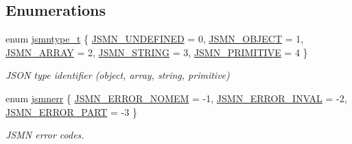 \subsection*{Enumerations}
\begin{DoxyCompactItemize}
\item 
enum \hyperlink{namespace_json_parser_generator_r_k_a45d8af9d310679633d258ed9b2caeeb3}{jsmntype\+\_\+t} \{ \newline
\hyperlink{namespace_json_parser_generator_r_k_a45d8af9d310679633d258ed9b2caeeb3af38a3f5a9af2aaf83f0fd6b38e6d80c5}{J\+S\+M\+N\+\_\+\+U\+N\+D\+E\+F\+I\+N\+ED} = 0, 
\hyperlink{namespace_json_parser_generator_r_k_a45d8af9d310679633d258ed9b2caeeb3a821e92d4b14438ba747826d5b889fe48}{J\+S\+M\+N\+\_\+\+O\+B\+J\+E\+CT} = 1, 
\hyperlink{namespace_json_parser_generator_r_k_a45d8af9d310679633d258ed9b2caeeb3a4f5a3b6dbf7ce0e6419264e11a7848c0}{J\+S\+M\+N\+\_\+\+A\+R\+R\+AY} = 2, 
\hyperlink{namespace_json_parser_generator_r_k_a45d8af9d310679633d258ed9b2caeeb3a672e86ca38a72245272a29ecdbe74a1a}{J\+S\+M\+N\+\_\+\+S\+T\+R\+I\+NG} = 3, 
\newline
\hyperlink{namespace_json_parser_generator_r_k_a45d8af9d310679633d258ed9b2caeeb3af36fefddaeac9a91bc69c938c8924568}{J\+S\+M\+N\+\_\+\+P\+R\+I\+M\+I\+T\+I\+VE} = 4
 \}\begin{DoxyCompactList}\small\item\em J\+S\+ON type identifier (object, array, string, primitive) \end{DoxyCompactList}
\item 
enum \hyperlink{namespace_json_parser_generator_r_k_ab03a941ba316b9487a16636e6db43edf}{jsmnerr} \{ \hyperlink{namespace_json_parser_generator_r_k_ab03a941ba316b9487a16636e6db43edfa629aaaf36d145f6b4968cb4a9ac9e2b1}{J\+S\+M\+N\+\_\+\+E\+R\+R\+O\+R\+\_\+\+N\+O\+M\+EM} = -\/1, 
\hyperlink{namespace_json_parser_generator_r_k_ab03a941ba316b9487a16636e6db43edfa266cf322392ed180b57e6cd7ed6b77a6}{J\+S\+M\+N\+\_\+\+E\+R\+R\+O\+R\+\_\+\+I\+N\+V\+AL} = -\/2, 
\hyperlink{namespace_json_parser_generator_r_k_ab03a941ba316b9487a16636e6db43edfafa021fb93449c243135e6158e1effa25}{J\+S\+M\+N\+\_\+\+E\+R\+R\+O\+R\+\_\+\+P\+A\+RT} = -\/3
 \}\begin{DoxyCompactList}\small\item\em J\+S\+MN error codes. \end{DoxyCompactList}
\end{DoxyCompactItemize}
